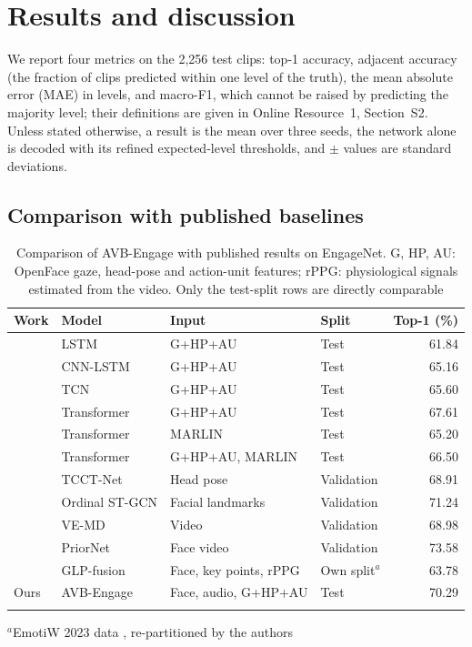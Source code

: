 \documentclass[pdflatex,iicol,sn-basic]{sn-jnl}
\newcommand{\ournet}{AVB-Engage}
\begin{document}
\section{Results and discussion}\label{sec:results}

We report four metrics on the 2,256 test clips: top-1 accuracy, adjacent accuracy (the fraction of clips predicted within one level of the truth), the mean absolute error (MAE) in levels, and macro-F1, which cannot be raised by predicting the majority level; their definitions are given in Online Resource~1, Section~S2. Unless stated otherwise, a result is the mean over three seeds, the network alone is decoded with its refined expected-level thresholds, and $\pm$ values are standard deviations.

\subsection{Comparison with published baselines}\label{sec:res_sota}

\begin{table}[t]
\tablebodyfont
\caption{Comparison of \ournet{} with published results on EngageNet. G, HP, AU: OpenFace gaze, head-pose and action-unit features; rPPG: physiological signals estimated from the video. Only the test-split rows are directly comparable}\label{tab:related}
\begin{tabular*}{\textwidth}{@{\extracolsep\fill}llllr}
\toprule
Work & Model & Input & Split & Top-1 (\%)\\
\midrule
\citet{singh2023engagenet} & LSTM & G+HP+AU & Test & 61.84\\
 & CNN-LSTM & G+HP+AU & Test & 65.16\\
 & TCN & G+HP+AU & Test & 65.60\\
 & Transformer & G+HP+AU & Test & 67.61\\
 & Transformer & MARLIN & Test & 65.20\\
 & Transformer & G+HP+AU, MARLIN & Test & 66.50\\
\citet{vedernikov2024tcct} & TCCT-Net & Head pose & Validation & 68.91\\
\citet{abedi2024stgcn} & Ordinal ST-GCN & Facial landmarks & Validation & 71.24\\
\citet{augusma2026vemd} & VE-MD & Video & Validation & 68.98\\
\citet{vedernikov2026priornet} & PriorNet & Face video & Validation & 73.58\\
\citet{qin2026glpfusion} & GLP-fusion & Face, key points, rPPG & Own split$^{a}$ & 63.78\\
\midrule
Ours & \ournet & Face, audio, G+HP+AU & Test & 70.29\\
\botrule
\end{tabular*}
\begin{tablenotes}
\item $^{a}$EmotiW 2023 data \citep{dhall2023emotiw}, re-partitioned by the authors
\end{tablenotes}
\end{table}
\end{document}
